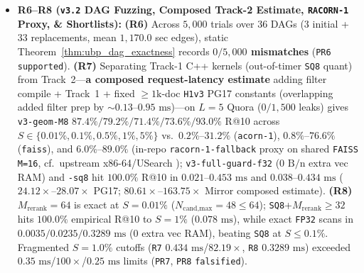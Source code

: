 \documentclass[conference]{IEEEtran}
\begin{document}
\begin{itemize}
    \item \textbf{R6--R8 (\texttt{v3.2} DAG Fuzzing, Composed Track-2 Estimate, \texttt{RACORN-1} Proxy, \& Shortlists):} \textbf{(R6)} Across $5{,}000$ trials over $36$ DAGs ($3$ initial + $33$ replacements, mean $1{,}170.0$ sec edges), static Theorem~\ref{thm:ubp_dag_exactness} records \textbf{$0/5{,}000$ mismatches} (\texttt{PR6 supported}). \textbf{(R7)} Separating Track-1 C++ kernels (out-of-timer \texttt{SQ8} quant) from Track~2---\textbf{a composed request-latency estimate} adding filter compile + Track~1 + fixed $\ge 1\text{k}$-doc \texttt{H1v3} PG17 constants (overlapping added filter prep by ${\sim}0.13$--$0.95\text{ ms}$)---on $L{=}5$ Quora ($0/1{,}500$ leaks) gives \texttt{v3-geom-M8} $87.4\%/79.2\%/71.4\%/73.6\%/93.0\%$ R@10 across $S\in\{0.01\%,0.1\%,0.5\%,1\%,5\%\}$ vs.\ $0.2\%$--$31.2\%$ (\texttt{acorn-1}), $0.8\%$--$76.6\%$ (\texttt{faiss}), and $6.0\%$--$89.0\%$ (in-repo \texttt{racorn-1-fallback} proxy on shared \texttt{FAISS M=16}, cf.\ upstream x86-64/USearch \cite{kim2026racorn}); \texttt{v3-full-guard-f32} ($0\text{ B/n}$ extra vec RAM) and \texttt{-sq8} hit $100.0\%$ R@10 in $0.021$--$0.453\text{ ms}$ and $0.038$--$0.434\text{ ms}$ ($24.12\times$--$28.07\times$ PG17; $80.61\times$--$163.75\times$ Mirror composed estimate). \textbf{(R8)} $M_{\text{rerank}}{=}64$ is exact at $S{=}0.01\%$ ($N_{\text{cand,max}}{=}48\le 64$); \texttt{SQ8}+$M_{\text{rerank}}\ge 32$ hits $100.0\%$ empirical R@10 to $S{=}1\%$ ($0.078\text{ ms}$), while exact \texttt{FP32} scans in $0.0035/0.0235/0.3289\text{ ms}$ ($0$ extra vec RAM), beating \texttt{SQ8} at $S \le 0.1\%$. Fragmented $S{=}1.0\%$ cutoffs (\texttt{R7} $0.434\text{ ms}$/$82.19\times$, \texttt{R8} $0.3289\text{ ms}$) exceeded $0.35\text{ ms}$/$100\times$/$0.25\text{ ms}$ limits (\texttt{PR7}, \texttt{PR8} \texttt{falsified}).

\end{itemize}
\end{document}
